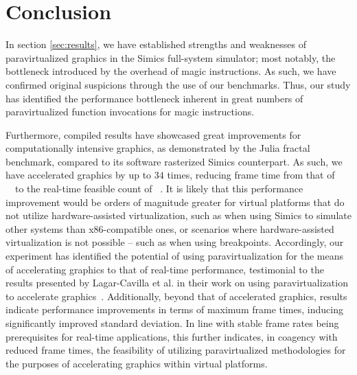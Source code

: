 
\section{Conclusion}
\label{sec:conclusion}
In section \ref{sec:results}, we have established strengths and weaknesses of paravirtualized graphics in the Simics full-system simulator; most notably, the bottleneck introduced by the overhead of magic instructions.
As such, we have confirmed original suspicions through the use of our benchmarks.
Thus, our study has identified the performance bottleneck inherent in great numbers of paravirtualized function invocations for magic instructions.

Furthermore, compiled results have showcased great improvements for computationally intensive graphics, as demonstrated by the Julia fractal benchmark, compared to its software rasterized Simics counterpart.
As such, we have accelerated graphics by up to $34$ times, reducing frame time from that of ~\milli\second\ to the real-time feasible count of ~\milli\second {}.
It is likely that this performance improvement would be orders of magnitude greater for virtual platforms that do not utilize hardware-assisted virtualization, such as when using Simics to simulate other systems than x86-compatible ones, or scenarios where hardware-assisted virtualization is not possible -- such as when using breakpoints.
Accordingly, our experiment has identified the potential of using paravirtualization for the means of accelerating graphics to that of real-time performance, testimonial to the results presented by Lagar-Cavilla et al. in their work on using paravirtualization to accelerate graphics~.
Additionally, beyond that of accelerated graphics, results indicate performance improvements in terms of maximum frame times, inducing significantly improved standard deviation.
In line with stable frame rates being prerequisites for real-time applications, this further indicates, in coagency with reduced frame times, the feasibility of utilizing paravirtualized methodologies for the purposes of accelerating graphics within virtual platforms.

